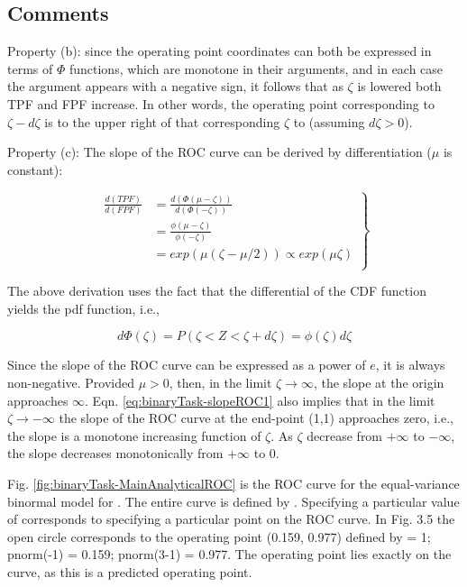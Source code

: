 \documentclass[
]{book}
\begin{document}
\hypertarget{comments}{%
\subsection{Comments}\label{comments}}

Property (b): since the operating point coordinates can both be expressed in terms of \(\Phi\) functions, which are monotone in their arguments, and in each case the argument appears with a negative sign, it follows that as \(\zeta\) is lowered both TPF and FPF increase. In other words, the operating point corresponding to \(\zeta - d\zeta\) is to the upper right of that corresponding \(\zeta\) to (assuming \(d\zeta > 0\)).

Property (c): The slope of the ROC curve can be derived by differentiation (\(\mu\) is constant):

\begin{equation} 
\left.
\begin{aligned}
\frac{d(TPF)}{d(FPF)}&=\frac{d(\Phi(\mu-\zeta))}{d(\Phi(-\zeta))}\\
&=\frac{\phi(\mu-\zeta)}{\phi(-\zeta)}\\
&=exp(\mu(\zeta-\mu/2)) \propto exp(\mu \zeta)\\
\end{aligned}
\right \}
\label{eq:binaryTask-slopeROC1}
\end{equation}

The above derivation uses the fact that the differential of the CDF function yields the pdf function, i.e.,

\[d\Phi(\zeta)=P\left ( \zeta < Z < \zeta + d \zeta \right ) = \phi(\zeta)d\zeta\]

Since the slope of the ROC curve can be expressed as a power of \(e\), it is always non-negative. Provided \(\mu > 0\), then, in the limit \(\zeta\rightarrow \infty\), the slope at the origin approaches \(\infty\). Eqn. \eqref{eq:binaryTask-slopeROC1} also implies that in the limit \(\zeta\rightarrow -\infty\) the slope of the ROC curve at the end-point (1,1) approaches zero, i.e., the slope is a monotone increasing function of \(\zeta\). As \(\zeta\) decrease from \(+\infty\) to \(-\infty\), the slope decreases monotonically from \(+\infty\) to 0.

Fig. \ref{fig:binaryTask-MainAnalyticalROC} is the ROC curve for the equal-variance binormal model for . The entire curve is defined by . Specifying a particular value of corresponds to specifying a particular point on the ROC curve. In Fig. 3.5 the open circle corresponds to the operating point (0.159, 0.977) defined by = 1; pnorm(-1) = 0.159; pnorm(3-1) = 0.977. The operating point lies exactly on the curve, as this is a predicted operating point.
\end{document}
